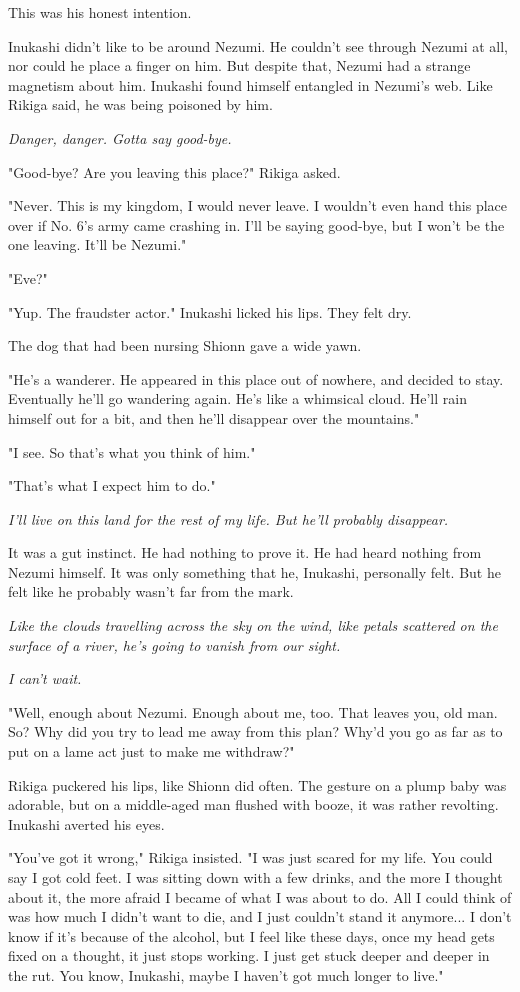 This was his honest intention.

Inukashi didn't like to be around Nezumi. He couldn't see through Nezumi
at all, nor could he place a finger on him. But despite that, Nezumi had
a strange magnetism about him. Inukashi found himself entangled in
Nezumi's web. Like Rikiga said, he was being poisoned by him.

\emph{Danger, danger. Gotta say good-bye.}

"Good-bye? Are you leaving this place?" Rikiga asked.

"Never. This is my kingdom, I would never leave. I wouldn't even hand
this place over if No. 6's army came crashing in. I'll be saying
good-bye, but I won't be the one leaving. It'll be Nezumi."

"Eve?"

"Yup. The fraudster actor." Inukashi licked his lips. They felt dry.~

The dog that had been nursing Shionn gave a wide yawn.

"He's a wanderer. He appeared in this place out of nowhere, and decided
to stay. Eventually he'll go wandering again. He's like a whimsical
cloud. He'll rain himself out for a bit, and then he'll disappear over
the mountains."

"I see. So that's what you think of him."

"That's what I expect him to do."

\emph{I'll live on this land for the rest of my life. But he'll probably
disappear.}

It was a gut instinct. He had nothing to prove it. He had heard nothing
from Nezumi himself. It was only something that he, Inukashi, personally
felt. But he felt like he probably wasn't far from the mark.

\emph{Like the clouds travelling across the sky on the wind, like petals
scattered on the surface of a river, he's going to vanish from our
sight.}

\emph{I can't wait.}

"Well, enough about Nezumi. Enough about me, too. That leaves you, old
man. So? Why did you try to lead me away from this plan? Why'd you go as
far as to put on a lame act just to make me withdraw?"

Rikiga puckered his lips, like Shionn did often. The gesture on a plump
baby was adorable, but on a middle-aged man flushed with booze, it was
rather revolting. Inukashi averted his eyes.

"You've got it wrong," Rikiga insisted. "I was just scared for my life.
You could say I got cold feet. I was sitting down with a few drinks, and
the more I thought about it, the more afraid I became of what I was
about to do. All I could think of was how much I didn't want to die, and
I just couldn't stand it anymore... I don't know if it's because of the
alcohol, but I feel like these days, once my head gets fixed on a
thought, it just stops working. I just get stuck deeper and deeper in
the rut. You know, Inukashi, maybe I haven't got much longer to live."

